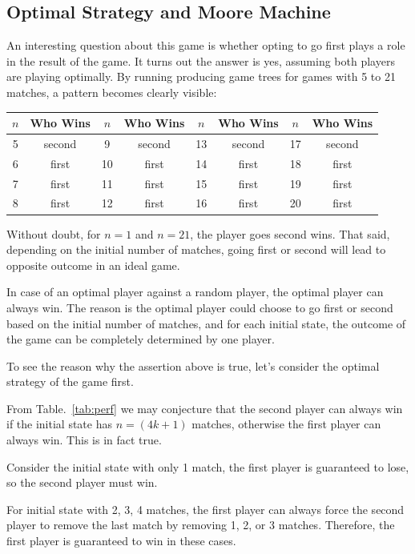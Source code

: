 \documentclass{article}
\begin{document}
\subsection{Optimal Strategy and Moore Machine}
An interesting question about this game is whether opting to go first plays a role in the result of the game. It turns out the answer is yes, assuming both players are playing optimally. By running producing game trees for games with 5 to 21 matches, a pattern becomes clearly visible:
\begin{table}[htbp]
\center
\begin{tabular}{c|c||c|c||c|c||c|c}
\hline
$n$ & Who Wins & $n$ & Who Wins & $n$ & Who Wins & $n$ & Who Wins\\
\hline
5 & second & 9 & second & 13 & second & 17 & second\\
6 & first & 10 & first & 14 & first & 18 & first\\
7 & first & 11 & first & 15 & first & 19 & first\\
8 & first & 12 & first & 16 & first & 20 & first\\
\hline
\end{tabular}
\end{table}
Without doubt, for $n=1$ and $n=21$, the player goes second wins. That said, depending on the initial number of matches, going first or second will lead to opposite outcome in an ideal game.

In case of an optimal player against a random player, the optimal player can always win. The reason is the optimal player could choose to go first or second based on the initial number of matches, and for each initial state, the outcome of the game can be completely determined by one player. 

To see the reason why the assertion above is true, let's consider the optimal strategy of the game first.

From Table.~\ref{tab:perf} we may conjecture that the second player can always win if the initial state has $n = (4k+1)$ matches, otherwise the first player can always win. This is in fact true.

Consider the initial state with only 1 match, the first player is guaranteed to lose, so the second player must win.

For initial state with 2, 3, 4 matches, the first player can always force the second player to remove the last match by removing 1, 2, or 3 matches. Therefore, the first player is guaranteed to win in these cases.
\end{document}
